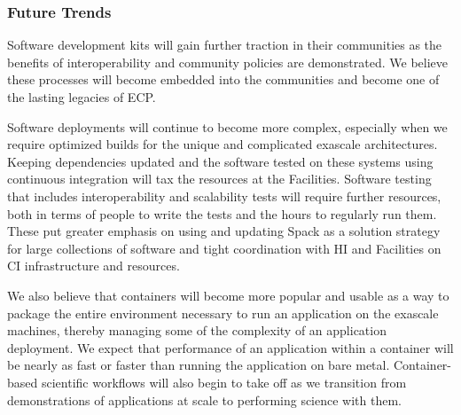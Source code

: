 \subsubsection{Future Trends}

Software development kits will gain further traction in their communities as the benefits of 
interoperability and community policies are demonstrated.  We believe these processes will
become embedded into the communities and become one of the lasting legacies of ECP.

Software deployments will continue to become more complex, especially when we require optimized 
builds for the unique and complicated exascale architectures.  Keeping dependencies updated and 
the software tested on these systems using continuous integration will tax the resources at 
the Facilities.  Software testing that includes interoperability and scalability tests will 
require further resources, both in terms of people to write the tests and the hours to
regularly run them.  These put greater emphasis on using and updating Spack as a
solution strategy for large collections of software and tight coordination with
HI and Facilities on CI infrastructure and resources.

We also believe that containers will become more popular and usable as a way to package the entire 
environment necessary to run an application on the exascale machines, thereby managing some of the 
complexity of an application deployment.  We expect that performance of an application within a 
container will be nearly as fast or faster than running the application on bare metal.  
Container-based scientific workflows will also begin to take off as we transition from
demonstrations of applications at scale to performing science with them.

